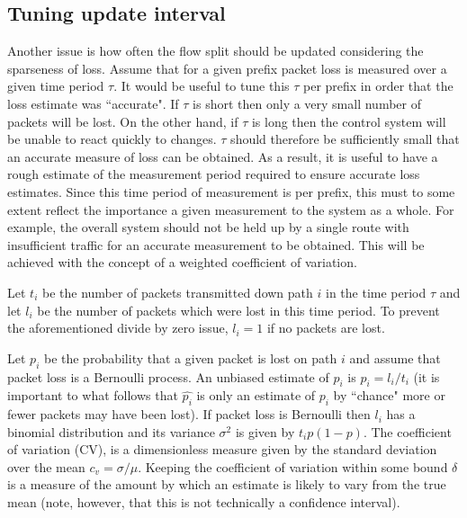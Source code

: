 \subsection{Tuning update interval}
Another issue is how often the flow split should be updated considering the sparseness of loss.
Assume that for a given prefix packet loss is measured over a given time period $\tau$.  
It would be useful to tune this $\tau$ per prefix in order that the loss estimate was ``accurate".  
If $\tau$ is short then only a very small number of packets will be lost.  
On the other hand, if $\tau$ is long then the control system will be unable to react quickly to changes.  
$\tau$ should therefore be sufficiently small that an accurate measure of loss can be obtained.  
As a result, it is useful to have a rough estimate of the measurement period required to ensure accurate loss estimates.
Since this time period of measurement is per prefix, this must to some extent reflect the importance a given measurement to the system as a whole.
For example, the overall system should not be held up by a single route with insufficient traffic for an accurate measurement to be obtained.
This will be achieved with the concept of a weighted coefficient of variation.

Let $t_i$ be the number of packets transmitted down path $i$ in the time period $\tau$ and let $l_i$ be the number of packets which were lost in this time period.
To prevent the aforementioned divide by zero issue, $l_i = 1$ if no packets are lost.

Let $p_i$ be the probability that a given packet is lost on path $i$ and assume that packet loss is a Bernoulli process.  
An unbiased estimate of $p_i$ is $\hat{p_i} = l_i/t_i$ (it is important to what follows that $\hat{p_i}$ is only an estimate of $p_i$ by ``chance" more or fewer packets may have been lost).  
If packet loss is Bernoulli then $l_i$ has a binomial distribution and its variance $\sigma^2$ is given by $t_i p(1-p)$.  
The coefficient of variation (CV), is a dimensionless measure given by the standard deviation over the mean $c_v= \sigma/\mu$.  
Keeping the coefficient of variation within some bound $\delta$ is a measure of the amount by which an estimate is likely to vary from the true mean (note, however, that this is not technically a confidence interval).

